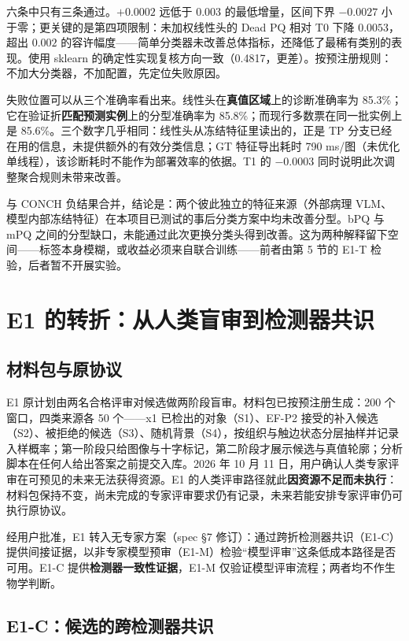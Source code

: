 \documentclass[11pt,a4paper,UTF8,fontset=fandol]{ctexart}
\begin{document}
六条中只有三条通过。$+0.0002$ 远低于 $0.003$ 的最低增量，区间下界 $-0.0027$ 小于零；更关键的是第四项限制：未加权线性头的 Dead PQ 相对 T0 下降 $0.0053$，超出 $0.002$ 的容许幅度——简单分类器未改善总体指标，还降低了最稀有类别的表现。使用 sklearn 的确定性实现复核方向一致（0.4817，更差）。按预注册规则：不加大分类器，不加配置，先定位失败原因。

失败位置可以从三个准确率看出来。线性头在\textbf{真值区域}上的诊断准确率为 85.3\%；它在验证折\textbf{匹配预测实例}上的分型准确率为 85.8\%；而现行多数票在同一批实例上是 85.6\%。三个数字几乎相同：线性头从冻结特征里读出的，正是 TP 分支已经在用的信息，未提供额外的有效分类信息；GT 特征导出耗时 790 ms/图（未优化单线程），该诊断耗时不能作为部署效率的依据。T1 的 $-0.0003$ 同时说明此次调整聚合规则未带来改善。

与 CONCH 负结果合并，结论是：两个彼此独立的特征来源（外部病理 VLM、模型内部冻结特征）在本项目已测试的事后分类方案中均未改善分型。bPQ 与 mPQ 之间的分型缺口，未能通过此次更换分类头得到改善。这为两种解释留下空间——标签本身模糊，或收益必须来自联合训练——前者由第 5 节的 E1-T 检验，后者暂不开展实验。

\section{E1 的转折：从人类盲审到检测器共识}

\subsection{材料包与原协议}

E1 原计划由两名合格评审对候选做两阶段盲审。材料包已按预注册生成\cite{specs}：200 个窗口，四类来源各 50 个——x1 已检出的对象（S1）、EF-P2 接受的补入候选（S2）、被拒绝的候选（S3）、随机背景（S4），按组织与触边状态分层抽样并记录入样概率；第一阶段只给图像与十字标记，第二阶段才展示候选与真值轮廓；分析脚本在任何人给出答案之前提交入库。2026 年 10 月 11 日，用户确认人类专家评审在可预见的未来无法获得资源。E1 的人类评审路径就此\textbf{因资源不足而未执行}：材料包保持不变，尚未完成的专家评审要求仍有记录，未来若能安排专家评审仍可执行原协议。

经用户批准，E1 转入无专家方案（spec \S7 修订）：通过跨折检测器共识（E1-C）提供间接证据，以非专家模型预审（E1-M）检验“模型评审”这条低成本路径是否可用。E1-C 提供\textbf{检测器一致性证据}，E1-M 仅验证模型评审流程；两者均不作生物学判断。

\subsection{E1-C：候选的跨检测器共识}
\end{document}

